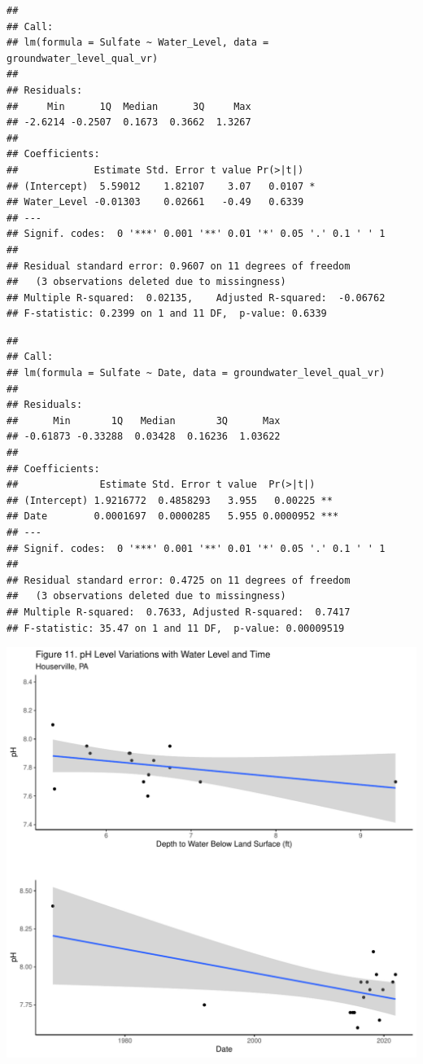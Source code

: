 \documentclass[
  12pt,
]{article}
\begin{document}
\newpage

\begin{verbatim}
## 
## Call:
## lm(formula = Sulfate ~ Water_Level, data = groundwater_level_qual_vr)
## 
## Residuals:
##     Min      1Q  Median      3Q     Max 
## -2.6214 -0.2507  0.1673  0.3662  1.3267 
## 
## Coefficients:
##             Estimate Std. Error t value Pr(>|t|)  
## (Intercept)  5.59012    1.82107    3.07   0.0107 *
## Water_Level -0.01303    0.02661   -0.49   0.6339  
## ---
## Signif. codes:  0 '***' 0.001 '**' 0.01 '*' 0.05 '.' 0.1 ' ' 1
## 
## Residual standard error: 0.9607 on 11 degrees of freedom
##   (3 observations deleted due to missingness)
## Multiple R-squared:  0.02135,    Adjusted R-squared:  -0.06762 
## F-statistic: 0.2399 on 1 and 11 DF,  p-value: 0.6339
\end{verbatim}

\begin{verbatim}
## 
## Call:
## lm(formula = Sulfate ~ Date, data = groundwater_level_qual_vr)
## 
## Residuals:
##      Min       1Q   Median       3Q      Max 
## -0.61873 -0.33288  0.03428  0.16236  1.03622 
## 
## Coefficients:
##              Estimate Std. Error t value  Pr(>|t|)    
## (Intercept) 1.9216772  0.4858293   3.955   0.00225 ** 
## Date        0.0001697  0.0000285   5.955 0.0000952 ***
## ---
## Signif. codes:  0 '***' 0.001 '**' 0.01 '*' 0.05 '.' 0.1 ' ' 1
## 
## Residual standard error: 0.4725 on 11 degrees of freedom
##   (3 observations deleted due to missingness)
## Multiple R-squared:  0.7633, Adjusted R-squared:  0.7417 
## F-statistic: 35.47 on 1 and 11 DF,  p-value: 0.00009519
\end{verbatim}

\newpage

\includegraphics{Draft_Final_files/figure-latex/linear_m4-1.pdf}
\end{document}
